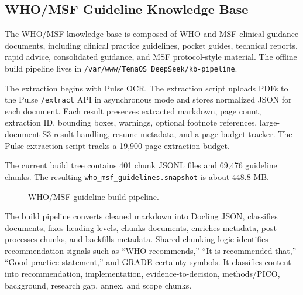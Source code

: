 \documentclass[11pt]{article}
\newcommand{\WHO}{WHO/MSF}
\begin{document}
\subsection{WHO/MSF Guideline Knowledge Base}

The \WHO{} knowledge base is composed of WHO and MSF clinical guidance documents, including clinical practice guidelines, pocket guides, technical reports, rapid advice, consolidated guidance, and MSF protocol-style material. The offline build pipeline lives in \texttt{/var/www/TenaOS\_DeepSeek/kb-pipeline}.

The extraction begins with Pulse OCR. The extraction script uploads PDFs to the Pulse \texttt{/extract} API in asynchronous mode and stores normalized JSON for each document. Each result preserves extracted markdown, page count, extraction ID, bounding boxes, warnings, optional footnote references, large-document S3 result handling, resume metadata, and a page-budget tracker. The Pulse extraction script tracks a 19,900-page extraction budget.

The current build tree contains 401 chunk JSONL files and 69,476 guideline chunks. The resulting \texttt{who\_msf\_guidelines.snapshot} is about 448.8 MB.

\begin{figure}[h]
\centering
{}
\caption{WHO/MSF guideline build pipeline.}
\end{figure}

The build pipeline converts cleaned markdown into Docling JSON, classifies documents, fixes heading levels, chunks documents, enriches metadata, post-processes chunks, and backfills metadata. Shared chunking logic identifies recommendation signals such as ``WHO recommends,'' ``It is recommended that,'' ``Good practice statement,'' and GRADE certainty symbols. It classifies content into recommendation, implementation, evidence-to-decision, methods/PICO, background, research gap, annex, and scope chunks.
\end{document}
